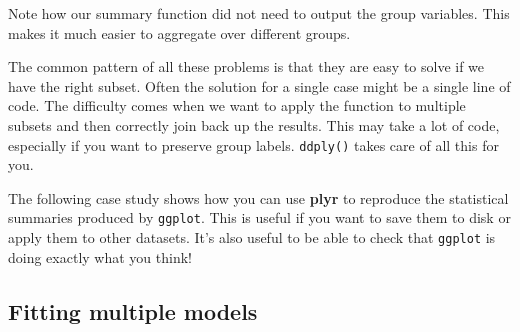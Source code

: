 \begin{Shaded}
\begin{Highlighting}[]
\StringTok{ }
  \NormalTok{(}
      \NormalTok{),}
     \NormalTok{(}
    \NormalTok{))}
\NormalTok{\}}
\end{Highlighting}
\end{Shaded}

Note how our summary function did not need to output the group
variables. This makes it much easier to aggregate over different groups.

The common pattern of all these problems is that they are easy to solve
if we have the right subset. Often the solution for a single case might
be a single line of code. The difficulty comes when we want to apply the
function to multiple subsets and then correctly join back up the
results. This may take a lot of code, especially if you want to preserve
group labels. \texttt{ddply()} takes care of all this for you.

The following case study shows how you can use \textbf{plyr} to
reproduce the statistical summaries produced by \texttt{ggplot}. This is
useful if you want to save them to disk or apply them to other datasets.
It's also useful to be able to check that \texttt{ggplot} is doing
exactly what you think!

\subsection{Fitting multiple models}\label{sub:multiple-models}

